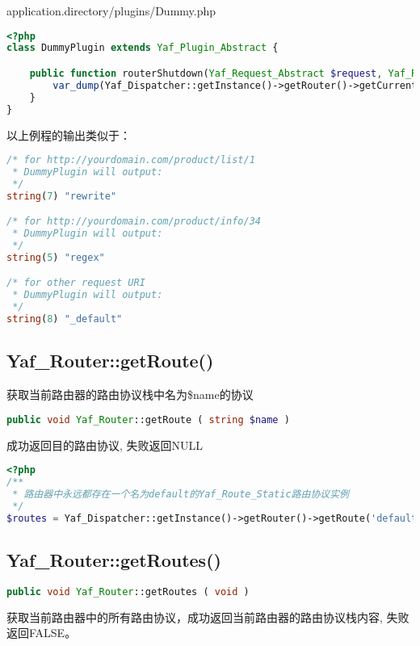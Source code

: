 \begin{example}
application.directory/plugins/Dummy.php
\begin{lstlisting}[language=PHP]
<?php
class DummyPlugin extends Yaf_Plugin_Abstract {

    public function routerShutdown(Yaf_Request_Abstract $request, Yaf_Response_Abstract $response) {
        var_dump(Yaf_Dispatcher::getInstance()->getRouter()->getCurrentRoute());
    }
}
\end{lstlisting}
\end{example}


以上例程的输出类似于：

\begin{lstlisting}[language=PHP]
/* for http://yourdomain.com/product/list/1
 * DummyPlugin will output:
 */
string(7) "rewrite"

/* for http://yourdomain.com/product/info/34
 * DummyPlugin will output:
 */
string(5) "regex"

/* for other request URI
 * DummyPlugin will output:
 */
string(8) "_default"
\end{lstlisting}

\subsection{Yaf\_Router::getRoute()}

获取当前路由器的路由协议栈中名为\$name的协议

\begin{lstlisting}[language=PHP]
public void Yaf_Router::getRoute ( string $name )
\end{lstlisting}

成功返回目的路由协议, 失败返回NULL

\begin{lstlisting}[language=PHP]
<?php
/**
 * 路由器中永远都存在一个名为default的Yaf_Route_Static路由协议实例
 */
$routes = Yaf_Dispatcher::getInstance()->getRouter()->getRoute('default');
\end{lstlisting}


\subsection{Yaf\_Router::getRoutes()}

\begin{lstlisting}[language=PHP]
public void Yaf_Router::getRoutes ( void )
\end{lstlisting}


获取当前路由器中的所有路由协议，成功返回当前路由器的路由协议栈内容, 失败返回FALSE。

